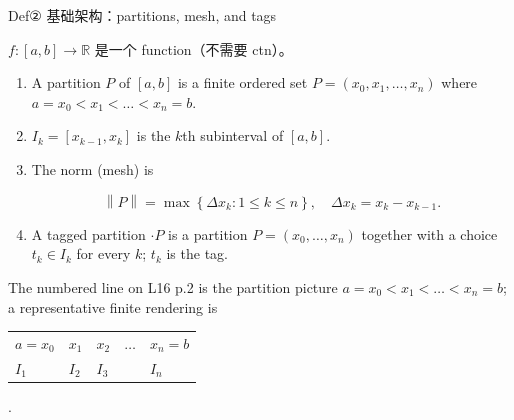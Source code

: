 \begin{definition}{Def② 基础架构：partitions, mesh, and tags}

\(f:\left\lbrack {a,b} \right\rbrack\rightarrow\mathbb{R}\) 是一个 function（不需要 ctn）。

\begin{enumerate}
\item
  A partition \(P\) of \(\left\lbrack {a,b} \right\rbrack\) is a finite ordered set \(P = \left( {x_{0},x_{1},\ldots,x_{n}} \right)\) where \(a = x_{0} < x_{1} < \ldots < x_{n} = b\).
\item
  \(I_{k} = \left\lbrack {x_{k - 1},x_{k}} \right\rbrack\) is the \(k\)th subinterval of \(\left\lbrack {a,b} \right\rbrack\).
\item
  The norm (mesh) is

  \[\left\| P \right\| = \max\left\{ {\Delta x_{k}:1 \leq k \leq n} \right\},\quad\Delta x_{k} = x_{k} - x_{k - 1}.\]
\item
  A tagged partition \(\cdot P\) is a partition \(P = \left( {x_{0},\ldots,x_{n}} \right)\) together with a choice \(t_{k} \in I_{k}\) for every \(k\); \(t_{k}\) is the tag.
\end{enumerate}

The numbered line on L16 p.2 is the partition picture \(a = x_{0} < x_{1} < \ldots < x_{n} = b\); a representative finite rendering is

{\def\LTcaptype{none} %
\begin{longtable}[]{@{}lllll@{}}
\toprule\noalign{}
\endhead
\bottomrule\noalign{}
\endlastfoot
\(a = x_{0}\) & \(x_{1}\) & \(x_{2}\) & \(\ldots\) & \(x_{n} = b\) \\
\(I_{1}\) & \(I_{2}\) & \(I_{3}\) & & \(I_{n}\) \\
\end{longtable}
}

.

\end{definition}

